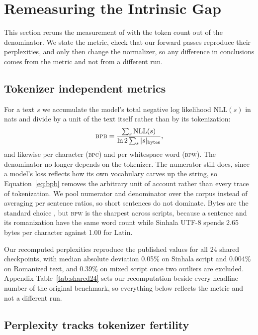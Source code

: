 \documentclass[11pt]{article}
\newcommand{\bpb}{\textsc{bpb}}
\newcommand{\bpw}{\textsc{bpw}}
\newcommand{\bpc}{\textsc{bpc}}
\begin{document}
\section{Remeasuring the Intrinsic Gap}
\label{sec:intrinsic}

This section reruns the measurement of \citet{rajapakse-weerasinghe-2026-script} with
the token count out of the denominator. We state the metric, check that our forward
passes reproduce their perplexities, and only then change the normalizer, so any
difference in conclusions comes from the metric and not from a different run.

\subsection{Tokenizer independent metrics}

For a text $s$ we accumulate the model's total negative log likelihood
$\mathrm{NLL}(s)$ in nats and divide by a unit of the text itself rather than by
its tokenization:
\begin{equation}
\bpb = \frac{\sum_s \mathrm{NLL}(s)}{\ln 2 \sum_s |s|_{\text{bytes}}},
\label{eq:bpb}
\end{equation}
and likewise per character (\bpc) and per whitespace word (\bpw). The denominator no
longer depends on the tokenizer. The numerator still does, since a model's loss reflects
how its own vocabulary carves up the string, so Equation~\ref{eq:bpb} removes the
arbitrary unit of account rather than every trace of tokenization. We pool numerator and
denominator over the corpus instead of averaging per sentence ratios, so short sentences
do not dominate. Bytes are the standard choice \citep{gao-etal-2020-pile}, but \bpw{} is
the sharpest across scripts, because a sentence and its romanization have the same word
count while Sinhala UTF-8 spends 2.65 bytes per character against 1.00 for Latin.

Our recomputed perplexities reproduce the published values for all 24 shared
checkpoints, with median absolute deviation 0.05\% on Sinhala script and 0.004\% on
Romanized text, and 0.39\% on mixed script once two outliers are excluded. Appendix
Table~\ref{tab:shared24} sets our recomputation beside every headline number of the
original benchmark, so everything below reflects the metric and not a different
run.

\subsection{Perplexity tracks tokenizer fertility}
\end{document}
